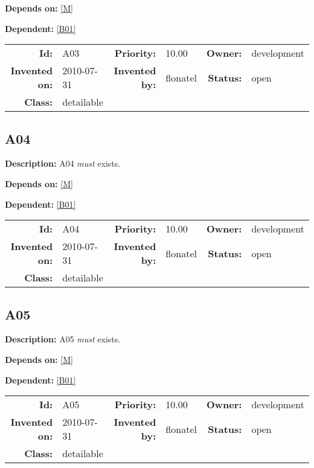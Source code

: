 \textbf{Depends on:} \ref{M} 

\textbf{Dependent:} \ref{B01} 

\par
{\small \begin{center}\begin{tabular}{rlrlrl}
\textbf{Id:} & A03  & \textbf{Priority:} & 10.00  & \textbf{Owner:} & development\\ 
\textbf{Invented on:} & 2010-07-31  & \textbf{Invented by:} & flonatel  & \textbf{Status:} & open \\ 
\textbf{Class:} & detailable  & & & \end{tabular}\end{center} }
\subsection{A04}\label{A04}
\textbf{Description:} A04 \textsl{must} exists.

\textbf{Depends on:} \ref{M} 

\textbf{Dependent:} \ref{B01} 

\par
{\small \begin{center}\begin{tabular}{rlrlrl}
\textbf{Id:} & A04  & \textbf{Priority:} & 10.00  & \textbf{Owner:} & development\\ 
\textbf{Invented on:} & 2010-07-31  & \textbf{Invented by:} & flonatel  & \textbf{Status:} & open \\ 
\textbf{Class:} & detailable  & & & \end{tabular}\end{center} }
\subsection{A05}\label{A05}
\textbf{Description:} A05 \textsl{must} exists.

\textbf{Depends on:} \ref{M} 

\textbf{Dependent:} \ref{B01} 

\par
{\small \begin{center}\begin{tabular}{rlrlrl}
\textbf{Id:} & A05  & \textbf{Priority:} & 10.00  & \textbf{Owner:} & development\\ 
\textbf{Invented on:} & 2010-07-31  & \textbf{Invented by:} & flonatel  & \textbf{Status:} & open \\ 
\textbf{Class:} & detailable  & & & \end{tabular}\end{center} }
